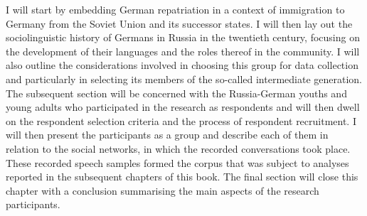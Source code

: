 I will start by embedding German repatriation in a context of immigration to Germany from the Soviet Union and its successor states. I will then lay out the sociolinguistic history of Germans in Russia in the twentieth century, focusing on the development of their languages and the roles thereof in the community. I will also outline the considerations involved in choosing this group for data collection and particularly in selecting its members of the so-called intermediate generation. The subsequent section will be concerned with the Russia-German youths and young adults who participated in the research as respondents and will then dwell on the respondent selection criteria and the process of respondent recruitment. I will then present the participants as a group and describe each of them in relation to the social networks, in which the recorded conversations took place. These recorded speech samples formed the corpus that was subject to analyses reported in the subsequent chapters of this book. The final section will close this chapter with a conclusion summarising the main aspects of the research participants.


